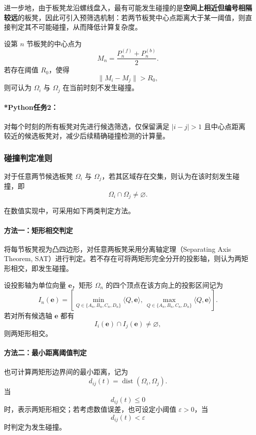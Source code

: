 \documentclass[12pt,a4paper]{ctexart}
\begin{document}
进一步地，由于板凳龙沿螺线盘入，最有可能发生碰撞的是\textbf{空间上相近但编号相隔较远}的板凳，因此可引入预筛选机制：若两节板凳中心点距离大于某一阈值，则直接判定其不可能碰撞，从而降低计算复杂度。

设第 $n$ 节板凳的中心点为
\begin{equation}
M_n=\frac{P_n^{(f)}+P_n^{(b)}}{2}.
\end{equation}
若存在阈值 $R_0$，使得
\begin{equation}
\|M_i-M_j\|>R_0,
\end{equation}
则可认为 $\Omega_i$ 与 $\Omega_j$ 在当前时刻不发生碰撞。

\paragraph{*Python任务2：}
对每个时刻的所有板凳对先进行候选筛选，仅保留满足 $|i-j|>1$ 且中心点距离较近的候选板凳对，减少后续精确碰撞检测的计算量。

\subsubsection{碰撞判定准则}
对于任意两节候选板凳 $\Omega_i$ 与 $\Omega_j$，若其区域存在交集，则认为在该时刻发生碰撞，即
\begin{equation}
\Omega_i \cap \Omega_j \neq \varnothing.
\end{equation}

在数值实现中，可采用如下两类判定方法。

\paragraph{方法一：矩形相交判定}
将每节板凳视为凸四边形，对任意两板凳采用分离轴定理（Separating Axis Theorem, SAT）进行判定。若不存在可将两矩形完全分开的投影轴，则认为两矩形相交，即发生碰撞。

设投影轴为单位向量 $\bm{e}$，矩形 $\Omega_n$ 的四个顶点在该方向上的投影区间记为
\begin{equation}
I_n(\bm{e})=
\left[
\min_{Q\in\{A_n,B_n,C_n,D_n\}}\langle Q,\bm{e}\rangle,\,
\max_{Q\in\{A_n,B_n,C_n,D_n\}}\langle Q,\bm{e}\rangle
\right].
\end{equation}
若对所有候选轴 $\bm{e}$ 都有
\begin{equation}
I_i(\bm{e})\cap I_j(\bm{e})\neq \varnothing,
\end{equation}
则两矩形相交。

\paragraph{方法二：最小距离阈值判定}
也可计算两矩形边界间的最小距离，记为
\begin{equation}
d_{ij}(t)=\operatorname{dist}(\Omega_i,\Omega_j).
\end{equation}
当
\begin{equation}
d_{ij}(t)\le 0
\end{equation}
时，表示两矩形相交；若考虑数值误差，也可设定小阈值 $\varepsilon>0$，当
\begin{equation}
d_{ij}(t)<\varepsilon
\end{equation}
时判定为发生碰撞。
\end{document}
